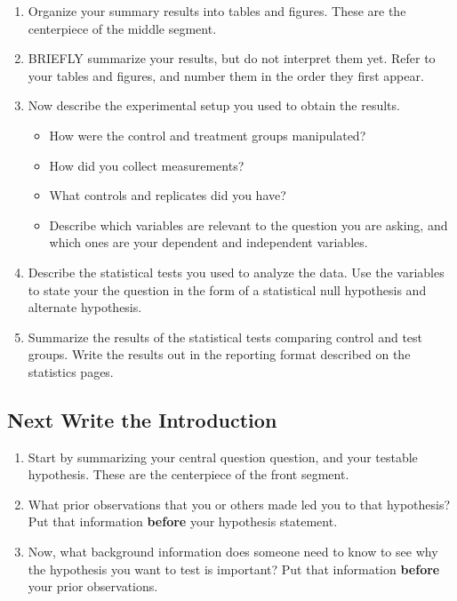 \documentclass[
]{book}
\providecommand{\tightlist}{%
  \setlength{\itemsep}{0pt}\setlength{\parskip}{0pt}}
\begin{document}
\begin{enumerate}
\def\labelenumi{\arabic{enumi}.}
\item
  Organize your summary results into tables and figures. These are the centerpiece of the middle segment.
\item
  BRIEFLY summarize your results, but do not interpret them yet. Refer to your tables and figures, and number them in the order they first appear.
\item
  Now describe the experimental setup you used to obtain the results.

  \begin{itemize}
  \tightlist
  \item
    How were the control and treatment groups manipulated?
  \item
    How did you collect measurements?
  \item
    What controls and replicates did you have?
  \item
    Describe which variables are relevant to the question you are asking, and which ones are your dependent and independent variables.
  \end{itemize}
\item
  Describe the statistical tests you used to analyze the data. Use the variables to state your the question in the form of a statistical null hypothesis and alternate hypothesis.
\item
  Summarize the results of the statistical tests comparing control and test groups. Write the results out in the reporting format described on the statistics pages.
\end{enumerate}

\hypertarget{next-write-the-introduction}{%
\subsection*{Next Write the Introduction}\label{next-write-the-introduction}}

\begin{enumerate}
\def\labelenumi{\arabic{enumi}.}
\setcounter{enumi}{5}
\item
  Start by summarizing your central question question, and your testable hypothesis. These are the centerpiece of the front segment.
\item
  What prior observations that you or others made led you to that hypothesis? Put that information \textbf{before} your hypothesis statement.
\item
  Now, what background information does someone need to know to see why the hypothesis you want to test is important? Put that information \textbf{before} your prior observations.
\end{enumerate}
\end{document}
